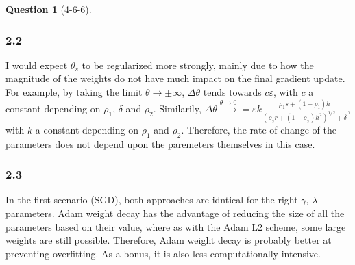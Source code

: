 \documentclass[12pt]{article}
\theoremstyle{definition}
\newtheorem{exercise}{Question}%
\begin{document}
\begin{exercise}[4-6-6]
{    \subsubsection*{2.2}
    I would expect $\theta_{s}$ to be regularized more strongly, mainly due to how
    the magnitude of the weights do not have much impact on the final gradient
    update. For example, by taking the limit $\theta \rightarrow \pm \infty$, $\Delta \theta$ tends towards $c  \varepsilon$,
    with $c$ a constant depending on $\rho_{1}$, $\delta$ and $ \rho_{2}$. Similarily,
    $\Delta \theta \xrightarrow{\theta \to 0} = \varepsilon k \frac{\rho_{1} s + (1-\rho_{1})h}{(\rho_{2}r+(1-\rho_{2})h^2)^{1/2} + \delta}$,
    with $k$ a constant depending on $\rho_{1}$ and $\rho_{2}$.  Therefore, the rate of
    change of the parameters does not depend upon the paremeters themselves in this
    case.
    \subsubsection*{2.3}
    In the first scenario (SGD), both approaches are idntical for the right
    $\gamma,\, \lambda$ parameters. Adam weight decay has the advantage of reducing the
    size of all the parameters based on their value, where as with the Adam L2
    scheme, some large weights are still possible. Therefore, Adam weight decay
    is probably better at preventing overfitting. As a bonus, it is also less
    computationally intensive.
    }
\end{exercise}
\end{document}
